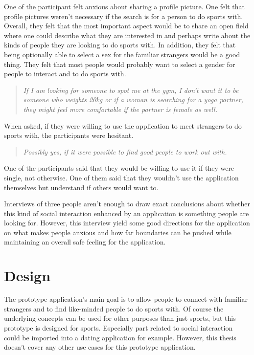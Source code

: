 One of the participant felt anxious about sharing a profile picture. One felt that profile pictures weren't necessary if the search is for a person to do sports with. Overall, they felt that the most important aspect would be to share an open field where one could describe what they are interested in and perhaps write about the kinds of people they are looking to do sports with. In addition, they felt that being optionally able to select a sex for the familiar strangers would be a good thing. They felt that most people would probably want to select a gender for people to interact and to do sports with.

\begin{quotation}
\it If I am looking for someone to spot me at the gym, I don't want it to be someone who weights 20kg or if a woman is searching for a yoga partner, they might feel more comfortable if the partner is female as well.
\end{quotation}

When asked, if they were willing to use the application to meet strangers to do sports with, the participants were hesitant.

\begin{quotation}
\it Possibly yes, if it were possible to find good people to work out with.
\end{quotation}

One of the participants said that they would be willing to use it if they were single, not otherwise. One of them said that they wouldn't use the application themselves but understand if others would want to.

Interviews of three people aren't enough to draw exact conclusions about whether this kind of social interaction enhanced by an application is something people are looking for. However, this interview yield some good directions for the application on what makes people anxious and how far boundaries can be pushed while maintaining an overall safe feeling for the application.


\section{Design}

The prototype application's main goal is to allow people to connect with familiar strangers and to find like-minded people to do sports with. Of course the underlying concepts can be used for other purposes than just sports, but this prototype is designed for sports. Especially part related to social interaction could be imported into a dating application for example. However, this thesis doesn't cover any other use cases for this prototype application.

